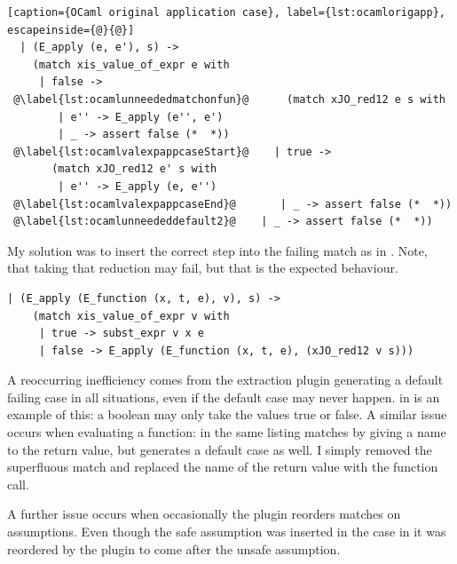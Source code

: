 \documentclass[12pt,twoside,notitlepage]{report}
\theoremstyle{plain}%
\theoremstyle{definition}
\theoremstyle{remark}
\begin{document}
\begin{minipage}{\linewidth}

\begin{lstlisting}[caption={OCaml original application case}, label={lst:ocamlorigapp}, escapeinside={@}{@}]
  | (E_apply (e, e'), s) ->
    (match xis_value_of_expr e with
     | false ->
 @\label{lst:ocamlunneededmatchonfun}@      (match xJO_red12 e s with
        | e'' -> E_apply (e'', e')
        | _ -> assert false (*  *))
 @\label{lst:ocamlvalexpappcaseStart}@    | true ->
       (match xJO_red12 e' s with
        | e'' -> E_apply (e, e'')
 @\label{lst:ocamlvalexpappcaseEnd}@       | _ -> assert false (*  *))
 @\label{lst:ocamlunneededdefault2}@    | _ -> assert false (*  *))
\end{lstlisting}

\end{minipage}
My solution was to insert the correct step into the failing match as in . Note, that taking that reduction may fail, but that is the expected behaviour.


\vspace{3mm}
\begin{minipage}{\linewidth}

\begin{lstlisting}[caption={OCaml fixed substitution case}, label={lst:ocamlfixsub}]
  | (E_apply (E_function (x, t, e), v), s) ->
    (match xis_value_of_expr v with
     | true -> subst_expr v x e
     | false -> E_apply (E_function (x, t, e), (xJO_red12 v s)))
\end{lstlisting}

\end{minipage}
A reoccurring inefficiency comes from the extraction plugin generating a default failing case in all situations, even if the default case may never happen.  in  is an example of this: a boolean may only take the values true or false. A similar issue occurs when evaluating a function:   in the same listing matches by giving a name to the return value, but generates a default case as well. I simply removed the superfluous match and replaced the name of the return value with the function call.

A further issue occurs when occasionally the plugin reorders matches on assumptions. Even though the safe assumption was inserted in the case in  it was reordered by the plugin to come after the unsafe assumption.\vspace{2mm}
\end{document}
